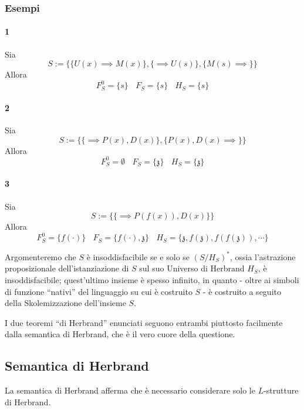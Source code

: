\subsubsection{Esempi}
\paragraph{1}
Sia 
$$
S := \{\{U(x) \implies M(x)\}, \{\implies U(s)\}, \{M(s) \implies\}\}
$$
Allora 
$$
F^0_S = \{s\} ~~~~ F_S = \{s\} ~~~~ H_S = \{s\}
$$
\paragraph{2}
Sia 
$$
S := \{\{\implies P(x),D(x)\}, \{P(x), D(x) \implies\}\}
$$
Allora 
$$
F^0_S = \emptyset ~~~~ F_S = \{\mathfrak{z}\} ~~~~ H_S = \{\mathfrak{z}\}
$$
\paragraph{3}
Sia 
$$
S := \{\{\implies P(f(x)),D(x)\}\}
$$
Allora 
$$
F^0_S = \{f(\cdot)\} ~~~~ F_S = \{f(\cdot),\mathfrak{z}\} ~~~~ H_S = \{\mathfrak{z}, f(\mathfrak{z}), f(f(\mathfrak{z})), \cdots\}
$$

\noindent
Argomenteremo che $S$ è insoddisfacibile se e solo se $(S/H_S)^*$, ossia 
l'astrazione proposizionale dell'istanziazione di $S$ sul suo Universo 
di Herbrand $H_S$, è insoddisfacibile; quest'ultimo insieme è spesso infinito, 
in quanto - oltre ai simboli di funzione ``nativi'' del linguaggio su cui 
è costruito $S$ - è costruito a seguito della Skolemizzazione dell'insieme $S$. 

I due teoremi ``di Herbrand'' enunciati seguono entrambi piuttosto facilmente 
dalla semantica di Herbrand, che è il vero cuore della questione. 

\subsection{Semantica di Herbrand}
La semantica di Herbrand afferma che è necessario considerare solo le 
$L$-strutture di Herbrand. 

